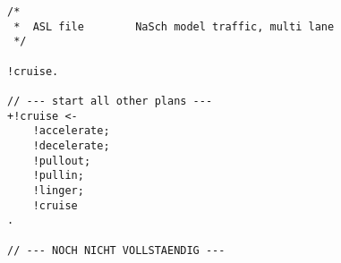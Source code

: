 \begin{lstlisting}[style=asl, 
                   keywords={+!cruise,+!accelerate,+!linger,+!decelerate,+!vehicle/collision}, 
                   keywords={[2]}, 
                   keywords={[3]}, 
                   caption={Agentenscript: NaSch-Modell, mehrspurig},
                   label={lst:multi-lane}]      
/*
 *  ASL file        NaSch model traffic, multi lane
 */

!cruise.

// --- start all other plans ---
+!cruise <-
    !accelerate;
    !decelerate;
    !pullout;
    !pullin;
    !linger;
    !cruise
.

// --- NOCH NICHT VOLLSTAENDIG ---
\end{lstlisting}


\newpage


